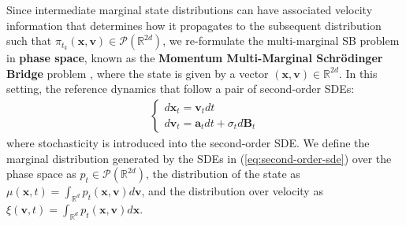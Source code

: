 \documentclass{article}
\newcommand{\boldtext}[1]{\textbf{\textcolor{MyGreen}{#1}}}
\begin{document}
Since intermediate marginal state distributions can have associated velocity information that determines how it propagates to the subsequent distribution such that $\pi_{t_k}(\boldsymbol{x}, \boldsymbol{v})\in \mathcal{P}(\mathbb{R}^{2d})$, we re-formulate the multi-marginal SB problem in \textbf{phase space}, known as the \boldtext{Momentum Multi-Marginal Schrödinger Bridge} problem \citep{theodoropoulos2025momentum, chen2023deep}, where the state is given by a vector $(\boldsymbol{x}, \boldsymbol{v})\in \mathbb{R}^{2d}$. In this setting, the reference dynamics that follow a pair of second-order SDEs:
\begin{align}
    \begin{cases}
        d\boldsymbol{x}_t=\boldsymbol{v}_tdt\\
        d\boldsymbol{v}_t=\boldsymbol{a}_tdt+ \sigma_td\boldsymbol{B}_t
    \end{cases}\label{eq:second-order-sde}
\end{align}
where stochasticity is introduced into the second-order SDE. We define the marginal distribution generated by the SDEs in (\ref{eq:second-order-sde}) over the phase space as $p_t\in \mathcal{P}(\mathbb{R}^{2d})$, the distribution of the state as $\mu(\boldsymbol{x},t)=\int_{\mathbb{R}^d}p_t(\boldsymbol{x},\boldsymbol{v})d\boldsymbol{v}$, and the distribution over velocity as $\xi(\boldsymbol{v},t)=\int_{\mathbb{R}^d}p_t(\boldsymbol{x},\boldsymbol{v})d\boldsymbol{x}$.
\end{document}
